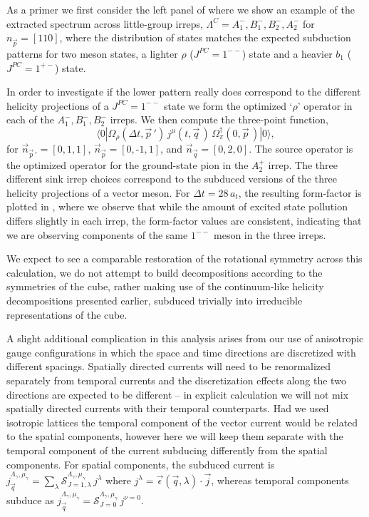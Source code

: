 As a primer we first consider the left panel of  where we show an example of the extracted spectrum across little-group irreps, $\Lambda^C = A_1^-, B_1^-, B_2^-, A_2^-$ for $n_{\vec{p}}=[110]$, where the distribution of states matches the expected subduction patterns for two meson states, a lighter $\rho$ ($J^{PC}=1^{--}$) state and a heavier $b_1$ ($J^{PC}=1^{+-}$) state.

In order to investigate if the lower pattern really does correspond to the different helicity projections of a $J^{PC} =1^{--}$ state we form the optimized `$\rho$' operator  in each of the $A_1^-, B_1^-, B_2^-$ irreps. We then compute the three-point function, 
\begin{equation*}
\langle 0 | \Omega_\rho(\Delta t,\vec{p}\,')\,  j^\mu(t,\vec{q}\,) \,  \Omega_\pi^\dagger(0,\vec{p}\,) | 0 \rangle,
\end{equation*}
for $\vec{n}_{\vec{p}\,'} = [0,1,1]$, $\vec{n}_{\vec{p}} = [0,\text{-}1,1]$, and $\vec{n}_{\vec{q}} = [0,2,0]$. The source operator is the optimized operator for the ground-state pion in the $A_2^+$ irrep. The three different sink irrep choices correspond to the subduced versions of the three helicity projections of a vector meson. For $\Delta t = 28\,  a_t$, the resulting form-factor is plotted in , where we observe that while the amount of excited state pollution differs slightly in each irrep, the form-factor values are consistent, indicating that we are observing components of the same $1^{--}$ meson in the three irreps. 

We expect to see a comparable restoration of the rotational symmetry across this calculation, we do not attempt to build decompositions according to the symmetries of the cube, rather making use of the continuum-like helicity decompositions presented earlier, subduced trivially into irreducible representations of the cube. 

A slight additional complication in this analysis arises from our use of anisotropic gauge configurations in which the space and time directions are discretized with different spacings. Spatially directed currents will need to be renormalized separately from temporal currents and the discretization effects along the two directions are expected to be different -- in explicit calculation we will not mix spatially directed currents with their temporal counterparts. Had we used isotropic lattices the temporal component of the vector current would be related to the spatial components, however here we will keep them separate with the temporal component of the current subducing differently from the spatial components. For spatial components, the subduced current is $j_{\vec{q}}^{\Lambda_\gamma, \mu_\gamma} = \sum_\lambda \mathcal{S}^{\Lambda_\gamma, \mu_\gamma}_{J=1,\lambda} \, j^\lambda$ where $j^\lambda = \vec{\epsilon}(\vec{q}, \lambda) \cdot \vec{j}$, whereas temporal components subduce as $j_{\vec{q}}^{\Lambda_\gamma, \mu_\gamma} = \mathcal{S}^{\Lambda_\gamma, \mu_\gamma}_{J=0} \, j^{\nu=0}$. 

